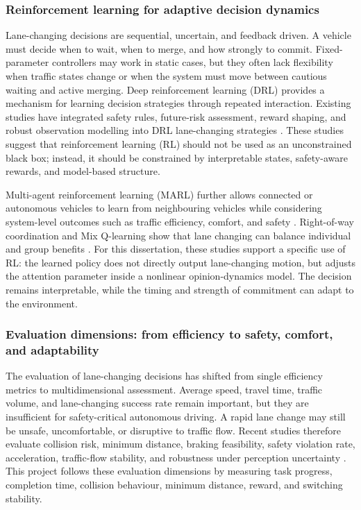 \subsubsection{Reinforcement learning for adaptive decision dynamics}

Lane-changing decisions are sequential, uncertain, and feedback driven. A vehicle must decide when to wait, when to merge, and how strongly to commit. Fixed-parameter controllers may work in static cases, but they often lack flexibility when traffic states change or when the system must move between cautious waiting and active merging. Deep reinforcement learning (DRL) provides a mechanism for learning decision strategies through repeated interaction. Existing studies have integrated safety rules, future-risk assessment, reward shaping, and robust observation modelling into DRL lane-changing strategies \cite{R9,R10,R11}. These studies suggest that reinforcement learning (RL) should not be used as an unconstrained black box; instead, it should be constrained by interpretable states, safety-aware rewards, and model-based structure.

Multi-agent reinforcement learning (MARL) further allows connected or autonomous vehicles to learn from neighbouring vehicles while considering system-level outcomes such as traffic efficiency, comfort, and safety \cite{R12}. Right-of-way coordination and Mix Q-learning show that lane changing can balance individual and group benefits \cite{R13,R14}. For this dissertation, these studies support a specific use of RL: the learned policy does not directly output lane-changing motion, but adjusts the attention parameter inside a nonlinear opinion-dynamics model. The decision remains interpretable, while the timing and strength of commitment can adapt to the environment.

\subsubsection{Evaluation dimensions: from efficiency to safety, comfort, and adaptability}

The evaluation of lane-changing decisions has shifted from single efficiency metrics to multidimensional assessment. Average speed, travel time, traffic volume, and lane-changing success rate remain important, but they are insufficient for safety-critical autonomous driving. A rapid lane change may still be unsafe, uncomfortable, or disruptive to traffic flow. Recent studies therefore evaluate collision risk, minimum distance, braking feasibility, safety violation rate, acceleration, traffic-flow stability, and robustness under perception uncertainty \cite{R7,R8,R10,R15}. This project follows these evaluation dimensions by measuring task progress, completion time, collision behaviour, minimum distance, reward, and switching stability.

